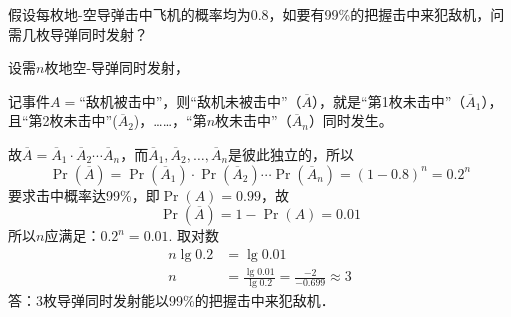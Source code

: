 \begin{example}
   假设每枚地-空导弹击中飞机的概率均为0.8，如要有99\%的把握击中来犯敌机，问需几枚导弹同时发射？ 
\end{example}


\begin{solution}
设需$n$枚地空-导弹同时发射，

记事件$A=$“敌机被击中”，则“敌机未被击中”（$\overline{A}$），就是“第1枚未击中”（$\overline{A}_1$），且“第2枚未击中”($\overline{A}_2$)，……，“第$n$枚未击中”（$\overline{A}_n$）同时发生。

故$\overline{A}=\overline{A}_1\cdot \overline{A}_2\cdots \overline{A}_n$，而$\overline{A}_1, \overline{A}_2,\ldots,\overline{A}_n$是彼此独立的，所以
\[\Pr(\overline{A})=\Pr(\overline{A}_1)\cdot \Pr(\overline{A}_2)\cdots\Pr(\overline{A}_n)=(1-0.8)^n=0.2^n\]
要求击中概率达99\%，即$\Pr(A)=0.99$，故
\[\Pr(\overline{A})=1-\Pr(A)=0.01\]
所以$n$应满足：$0.2^n=0.01$. 取对数
\[\begin{split}
    n\lg0.2&=\lg0.01\\
n&=\frac{\lg0.01}{\lg0.2}=\frac{-2}{-0.699}\approx 3
\end{split} \]
答：3枚导弹同时发射能以99\%的把握击中来犯敌机．    
\end{solution}

